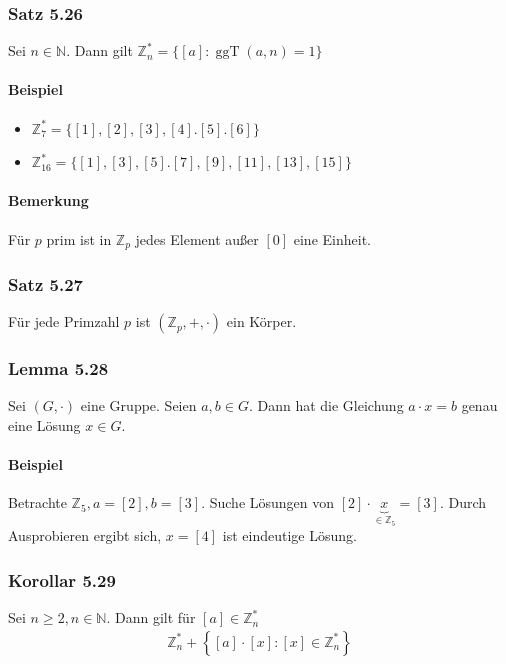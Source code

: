 \documentclass[a5paper, 10pt]{book}
\DeclareMathOperator{\ggT}{ggT}
\newcommand{\inN}{\in\mathbb{N}}
\begin{document}
				\subsubsection{Satz 5.26}
					Sei $n \inN.$ Dann gilt $\mathbb{Z}_n^* = \{ [a]: \ggT(a,n) = 1 \}$
					
					\paragraph{Beispiel}
						\begin{itemize}
							\item $\mathbb{Z}_7^* = \{[1], [2], [3], [4]. [5]. [6] \}$
							\item $\mathbb{Z}_{16}^* = \{[1], [3], [5]. [7], [9], [11], [13], [15] \}$
						\end{itemize}
					
					\paragraph{Bemerkung} Für $p$ prim ist in $\mathbb{Z}_p$ jedes Element außer $[0]$ eine Einheit.
					
				\subsubsection{Satz 5.27} Für jede Primzahl $p$ ist $(\mathbb{Z}_p, +, \cdot)$ ein Körper.
				
				\subsubsection{Lemma 5.28} Sei $(G, \cdot)$ eine Gruppe. Seien $a,b \in G$. Dann hat die Gleichung $a\cdot x = b$ genau eine Lösung $x \in G$.
					\paragraph{Beispiel} Betrachte $\mathbb{Z}_5, a = [2], b = [3]$. Suche Lösungen von $[2] \cdot \underbrace{x}_{\in \mathbb{Z}_5} = [3]$. Durch Ausprobieren ergibt sich, $x = [4]$ ist eindeutige Lösung.
					
				\subsubsection{Korollar 5.29}
					Sei $n\geq 2, n\inN$. Dann gilt für $[a] \in \mathbb{Z}_n^*$
					\begin{align}
						\mathbb{Z}_n^* + \left\{ [a] \cdot [x] : [x] \in \mathbb{Z}_n^* \right\}
					\end{align}
					
\end{document}
